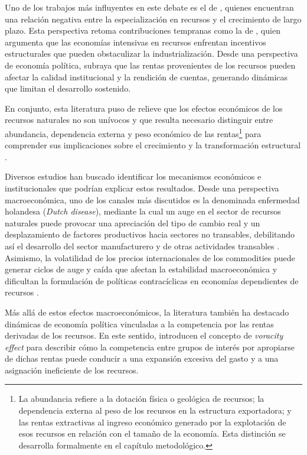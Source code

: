 \documentclass[../../TFM.tex]{subfiles}
\begin{document}
	Uno de los trabajos más influyentes en este debate es el de \textcite{Sachs2001}, quienes encuentran una relación negativa entre la especialización en recursos y el crecimiento de largo plazo. Esta perspectiva retoma contribuciones tempranas como la de \textcite{Auty1993}, quien argumenta que las economías intensivas en recursos enfrentan incentivos estructurales que pueden obstaculizar la industrialización. Desde una perspectiva de economía política, \textcite{Ross1999} subraya que las rentas provenientes de los recursos pueden afectar la calidad institucional y la rendición de cuentas, generando dinámicas que limitan el desarrollo sostenido.

	En conjunto, esta literatura puso de relieve que los efectos económicos de los recursos naturales no son unívocos y que resulta necesario distinguir entre abundancia, dependencia externa y peso económico de las rentas\footnote{La abundancia refiere a la dotación física o geológica de recursos; la dependencia externa al peso de los recursos en la estructura exportadora; y las rentas extractivas al ingreso económico generado por la explotación de esos recursos en relación con el tamaño de la economía. Esta distinción se desarrolla formalmente en el capítulo metodológico.} para comprender sus implicaciones sobre el crecimiento y la transformación estructural \parencite{VanDerPloeg2011}.

	Diversos estudios han buscado identificar los mecanismos económicos e institucionales que podrían explicar estos resultados. Desde una perspectiva macroeconómica, uno de los canales más discutidos es la denominada enfermedad holandesa (\textit{Dutch disease}), mediante la cual un auge en el sector de recursos naturales puede provocar una apreciación del tipo de cambio real y un desplazamiento de factores productivos hacia sectores no transables, debilitando así el desarrollo del sector manufacturero y de otras actividades transables \parencite{Corden1982}. Asimismo, la volatilidad de los precios internacionales de los commodities puede generar ciclos de auge y caída que afectan la estabilidad macroeconómica y dificultan la formulación de políticas contracíclicas en economías dependientes de recursos \parencite{Anne2021}.

	Más allá de estos efectos macroeconómicos, la literatura también ha destacado dinámicas de economía política vinculadas a la competencia por las rentas derivadas de los recursos. En este sentido, \textcite{Tornell1999} introducen el concepto de \textit{voracity effect} para describir cómo la competencia entre grupos de interés por apropiarse de dichas rentas puede conducir a una expansión excesiva del gasto y a una asignación ineficiente de los recursos.
\end{document}
